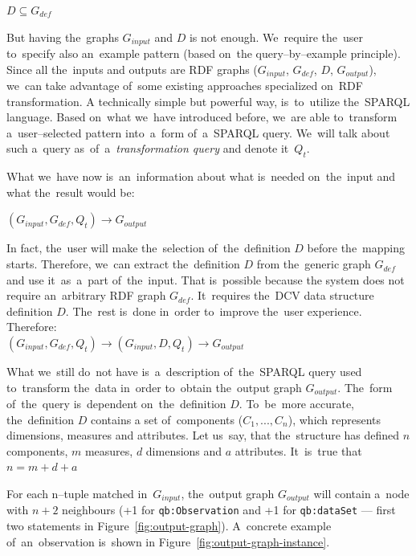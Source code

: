{\centering $D \subseteq G_{def}$ \\[0.5cm]}

But having the~graphs $G_{input}$ and $D$ 
is not enough. We~require the~user to~specify also an~example pattern (based on~the
query--by--example principle). Since all the~inputs and outputs are RDF
graphs ($G_{input}$, $G_{def}$, $D$, $G_{output}$), we~can take 
advantage of~some existing approaches specialized on~RDF transformation. 
A technically simple but powerful way, is~to~utilize the~SPARQL language. Based on~what we~have introduced before, we~are able to~transform a~user--selected pattern into~a~form of~a~SPARQL
query. We~will talk about such a~query as~of~a~\emph{transformation query} and denote it~$Q_t$.

What we~have now is~an~information about what is~needed on~the~input and 
what the~result would be:

{\centering $(G_{input}, G_{def}, Q_t) \rightarrow G_{output}$ \\[0.5cm]}

In fact, the~user will make the~selection of~the~definition $D$ before the~mapping starts. Therefore, we~can extract the~definition $D$ from the~generic graph $G_{def}$ and use it~as~a~part of~the~input. That is~possible because 
the system does not require an~arbitrary RDF graph $G_{def}$. It~requires the~DCV 
data structure definition $D$. The~rest is~done in~order to~improve the~user 
experience. Therefore:\\

{\centering $(G_{input}, G_{def}, Q_t) \rightarrow (G_{input}, D, Q_t) \rightarrow G_{output}$  \\[0.5cm]}

What we~still do~not have is~a~description of~the~SPARQL query used to~transform the~data in~order to~obtain the~output graph $G_{output}$. The~form of~the~query is~dependent on~the~definition $D$. To~be~more accurate, the~definition $D$ contains
a set of~components ($C_1, ... , C_n$), which represents dimensions, measures and attributes. Let us~say, that the~structure has defined $n$ components, $m$ measures, $d$ dimensions and $a$ 
attributes. It~is~true that\\

{\centering $n = m+d+a$ \\[0.5cm]}

For each n--tuple matched in~$G_{input}$, the~output graph $G_{output}$ will contain a~node with $n+2$ 
neighbours (+1 for \verb|qb:Observation| and +1 for \verb|qb:dataSet| --- first two statements
in Figure~\ref{fig:output-graph}). A~concrete example of~an~observation is~shown 
in Figure~\ref{fig:output-graph-instance}.


